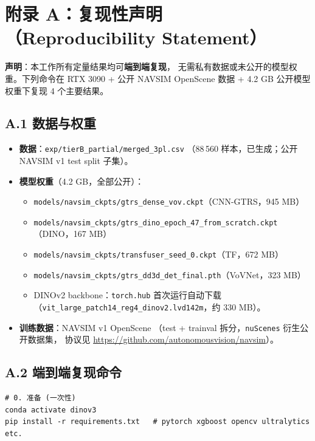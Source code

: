 \documentclass[a4paper,12pt,fontset=fandol]{ctexart}
\begin{document}
{%
\newpage
\section*{附录 A：复现性声明（Reproducibility Statement）}
\small

\noindent\textbf{声明}：本工作所有定量结果均可\textbf{端到端复现}，
无需私有数据或未公开的模型权重。下列命令在 RTX 3090 + 公开
NAVSIM OpenScene 数据 + 4.2 GB 公开模型权重下复现 4 个主要结果。

\subsection*{A.1 数据与权重}

\begin{itemize}[leftmargin=*]
\item \textbf{数据}：\texttt{exp/tierB\_partial/merged\_3pl.csv}
      （88\,560 样本，已生成；公开 NAVSIM v1 test split 子集）。
\item \textbf{模型权重}（4.2 GB，全部公开）：
      \begin{itemize}
      \item \texttt{models/navsim\_ckpts/gtrs\_dense\_vov.ckpt}（CNN-GTRS，945 MB）
      \item \texttt{models/navsim\_ckpts/gtrs\_dino\_epoch\_47\_from\_scratch.ckpt}（DINO，167 MB）
      \item \texttt{models/navsim\_ckpts/transfuser\_seed\_0.ckpt}（TF，672 MB）
      \item \texttt{models/navsim\_ckpts/gtrs\_dd3d\_det\_final.pth}（VoVNet，323 MB）
      \item DINOv2 backbone：\texttt{torch.hub} 首次运行自动下载
            （\texttt{vit\_large\_patch14\_reg4\_dinov2.lvd142m}，约 330 MB）。
      \end{itemize}
\item \textbf{训练数据}：NAVSIM v1 OpenScene
      （test + trainval 拆分，\texttt{nuScenes} 衍生公开数据集，
      协议见 \url{https://github.com/autonomousvision/navsim}）。
\end{itemize}

\subsection*{A.2 端到端复现命令}

\begin{verbatim}
# 0. 准备 (一次性)
conda activate dinov3
pip install -r requirements.txt   # pytorch xgboost opencv ultralytics etc.


\end{verbatim}}
\end{document}
